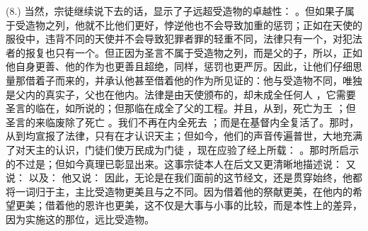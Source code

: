 (8.) 当然，宗徒继续说下去的话，显示了子远超受造物的卓越性： 。但如果子属于受造物之列，他就不比他们更好，悖逆他也不会导致加重的惩罚；正如在天使的服役中，违背不同的天使并不会导致犯罪者罪的轻重不同，法律只有一个，对犯法者的报复也只有一个。但正因为圣言不属于受造物之列，而是父的子，所以，正如他自身更善、他的作为也更善且超绝，同样，惩罚也更严厉。因此，让他们仔细思量那借着子而来的，并承认他甚至借着他的作为所见证的：他与受造物不同，唯独是父内的真实子，父也在他内。法律是由天使颁布的，却未成全任何人 ，它需要圣言的临在，如所说的；但那临在成全了父的工程。并且，从到，死亡为王 ；但圣言的来临废除了死亡 。我们不再在内全死去 ；而是在基督内全复活了。那时，从到均宣报了法律，只有在才认识天主；但如今，他们的声音传遍普世，大地充满了对天主的认识，门徒们使万民成为门徒 ，现在应验了经上所载： 。那时所启示的不过是；但如今真理已彰显出来。这事宗徒本人在后文又更清晰地描述说： 又说： 以及： 他又说： 因此，无论是在我们面前的这节经文，还是贯穿始终，他都将一词归于主，主比受造物更美且与之不同。因为借着他的祭献更美，在他内的希望更美；借着他的恩许也更美，这不仅是大事与小事的比较，而是本性上的差异，因为实施这的那位，远比受造物。\par

